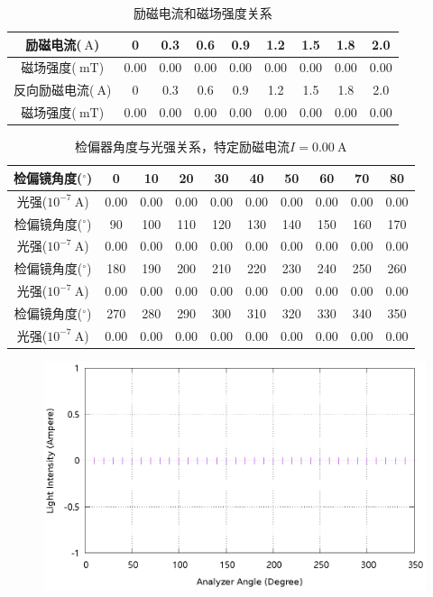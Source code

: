 \documentclass{ctexart}
\newcommand{\si}[1]{\  \mathrm{#1}}
\begin{document}
\newpage
\begin{table}[H]
    \centering
    \begin{tabular}{|c|c|c|c|c|c|c|c|c|}
        \hline
        励磁电流($\si{A}$)   & 0   & 0.3 & 0.6 & 0.9 & 1.2 & 1.5 & 1.8 & 2.0 \\\hline
        磁场强度($\si{mT}$)  & 0.00 & 0.00 & 0.00 & 0.00 & 0.00 & 0.00 & 0.00 & 0.00 \\\hline
        反向励磁电流($\si{A}$) & 0   & 0.3 & 0.6 & 0.9 & 1.2 & 1.5 & 1.8 & 2.0 \\\hline
        磁场强度($\si{mT}$)  & 0.00 & 0.00 & 0.00 & 0.00 & 0.00 & 0.00 & 0.00 & 0.00 \\\hline
    \end{tabular}
    \caption{励磁电流和磁场强度关系}
\end{table}
\newpage
\begin{table}[H]
    \centering
    \begin{tabular}{|c|c|c|c|c|c|c|c|c|c|}
        \hline
        检偏镜角度(${}^{\circ}$)  & 0   & 10  & 20  & 30  & 40  & 50  & 60  & 70  & 80  \\\hline
        光强($10^{-7} \si{A}$) & 0.00 & 0.00 & 0.00 & 0.00 & 0.00 & 0.00 & 0.00 & 0.00 & 0.00 \\\hline
        检偏镜角度(${}^{\circ}$)  & 90  & 100 & 110 & 120 & 130 & 140 & 150 & 160 & 170 \\\hline
        光强($10^{-7} \si{A}$) & 0.00 & 0.00 & 0.00 & 0.00 & 0.00 & 0.00 & 0.00 & 0.00 & 0.00 \\\hline
        检偏镜角度(${}^{\circ}$)  & 180 & 190 & 200 & 210 & 220 & 230 & 240 & 250 & 260 \\\hline
        光强($10^{-7} \si{A}$) & 0.00 & 0.00 & 0.00 & 0.00 & 0.00 & 0.00 & 0.00 & 0.00 & 0.00 \\\hline
        检偏镜角度(${}^{\circ}$)  & 270 & 280 & 290 & 300 & 310 & 320 & 330 & 340 & 350 \\\hline
        光强($10^{-7} \si{A}$) & 0.00 & 0.00 & 0.00 & 0.00 & 0.00 & 0.00 & 0.00 & 0.00 & 0.00 \\\hline
    \end{tabular}
    \caption{检偏器角度与光强关系，特定励磁电流$I=0.00 \si{A}$}
\end{table}
\begin{figure}[H]
    \centering
    \includegraphics[width=0.9\linewidth]{../output/analyzer-angle-light-intensity-1.gnuplot}
\end{figure}
\end{document}
